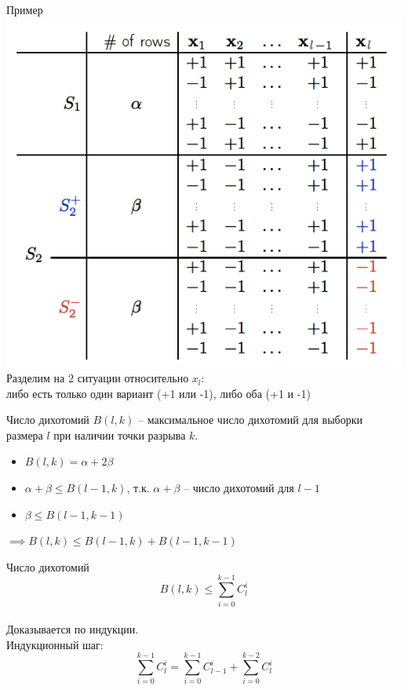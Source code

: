 \documentclass[10pt]{beamer}
\begin{document}
\begin{frame}{Пример}  
  \centering
  \includegraphics[width=\textwidth, height=0.8 \textheight, keepaspectratio]{images/breakpoint}\\
  Разделим на 2 ситуации относительно $x_l$: \\либо есть только один вариант (+1 или -1), либо оба (+1 и -1)
\end{frame}

\begin{frame}{Число дихотомий}  
  $B(l, k)$ -- максимальное число дихотомий для выборки размера $l$ при наличии точки разрыва $k$.\\
  \bigbreak
  \begin{itemize}
    \item $B(l, k) = \alpha  + 2\beta$
    \item $\alpha + \beta \leq B(l-1, k)$, т.к. $\alpha + \beta$ -- число дихотомий для $l-1$\\
    \item $\beta \leq B(l-1, k-1)$ 
  \end{itemize}
  $\implies B(l, k) \leq B(l-1, k) + B(l-1, k-1)$
\end{frame}

\begin{frame}{Число дихотомий}  
  $$B(l, k) \leq \sum\limits_{i=0}^{k-1} C_l^i$$\\
  Доказывается по индукции.\\
  Индукционный шаг:
  $$\sum\limits_{i=0}^{k-1} C_l^i = \sum\limits_{i=0}^{k-1} C_{l-1}^i + \sum\limits_{i=0}^{k-2} C_l^i$$
\end{frame}
\end{document}
